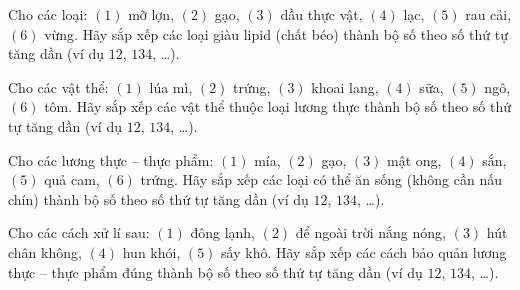 \documentclass[Main.tex]{subfiles}
\begin{document}
\begin{ex}%
	Cho các loại: $(1)$ mỡ lợn, $(2)$ gạo, $(3)$ dầu thực vật, $(4)$ lạc, $(5)$ rau cải, $(6)$ vừng. Hãy sắp xếp các loại giàu lipid (chất béo) thành bộ số theo số thứ tự tăng dần (ví dụ $12$, $134$, …).
\end{ex}

\begin{ex}%
	Cho các vật thể: $(1)$ lúa mì, $(2)$ trứng, $(3)$ khoai lang, $(4)$ sữa, $(5)$ ngô, $(6)$ tôm. Hãy sắp xếp các vật thể thuộc loại lương thực thành bộ số theo số thứ tự tăng dần (ví dụ $12$, $134$, …).
\end{ex}

\begin{ex}%
	Cho các lương thực -- thực phẩm: $(1)$ mía, $(2)$ gạo, $(3)$ mật ong, $(4)$ sắn, $(5)$ quả cam, $(6)$ trứng. Hãy sắp xếp các loại có thể ăn sống (không cần nấu chín) thành bộ số theo số thứ tự tăng dần (ví dụ $12$, $134$, …).
\end{ex}

\begin{ex}%
	Cho các cách xử lí sau: $(1)$ đông lạnh, $(2)$ để ngoài trời nắng nóng, $(3)$ hút chân không, $(4)$ hun khói, $(5)$ sấy khô. Hãy sắp xếp các cách bảo quản lương thực -- thực phẩm đúng thành bộ số theo số thứ tự tăng dần (ví dụ $12$, $134$, …).
\end{ex}
\end{document}

